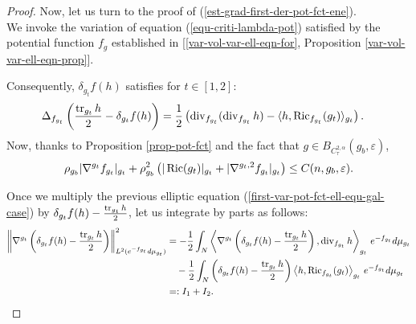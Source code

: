\documentclass[a4paper,11pt,reqno]{amsart}
\def\Ric{\mathop{\rm Ric}\nolimits}
\def\tr{\mathop{\rm tr}\nolimits}
\def\div{\mathop{\rm div}\nolimits}
\def\Ric{\mathop{\rm Ric}\nolimits}
\def\tr{\mathop{\rm tr}\nolimits}
\def\div{\mathop{\rm div}\nolimits}
\numberwithin{equation}{section}
\begin{document}
\begin{proof}
		Now, let us turn to the proof of (\ref{est-grad-first-der-pot-fct-ene}).\\
		
		We invoke the variation of equation (\ref{equ-criti-lambda-pot}) satisfied by the potential function $f_g$ established in [\eqref{var-vol-var-ell-eqn-for}, Proposition \ref{var-vol-var-ell-eqn-prop}].
		
		Consequently, $\delta_{g_t}f(h)$ satisfies for $t\in[1,2]$:
		\begin{equation}
		\begin{split}\label{first-var-pot-fct-ell-equ-gal-case}
		\Delta_{f_{g_t}}\left(\frac{\tr_{g_t}h}{2}-\delta_{g_t}f(h)\right)&=\frac{1}{2}\left(\div_{f_{g_t}}(\div_{f_{g_t}}h)-\langle h,\Ric_{f_{g_t}}(g_t)\rangle_{g_t}\right).
		\end{split}
		\end{equation}
		Now, thanks to Proposition \ref{prop-pot-fct} and the fact that $g\in B_{C^{2,\alpha}_{\tau}}(g_b,\varepsilon)$, 
		\begin{equation}
		\rho_{g_b}|\nabla^{g_t}f_{g_t}|_{g_t}+\rho^2_{g_b}\left(|\Ric(g_t)|_{g_t}+|\nabla^{g_t,2}f_{g_t}|_{g_t}\right)\leq C(n,g_b,\varepsilon).\label{est-pot-fct-ene-est}
		\end{equation}
		
		
		Once we multiply the previous elliptic equation (\ref{first-var-pot-fct-ell-equ-gal-case}) by $\delta_{g_t}f(h)-\frac{\tr_{g_t}h}{2}$, let us integrate by parts as follows:
		\begin{equation}
		\begin{split}\label{grad-first-var-pot-fct-ene-est}
		\left\|\nabla^{g_t}\left(\delta_{g_t}f(h)-\frac{\tr_{g_t}h}{2}\right)\right\|^2_{L^2(e^{-f_{g_t}}d\mu_{g_t})}&=-\frac{1}{2}\int_N\left\langle\nabla^{g_t}\left(\delta_{g_t}f(h)-\frac{\tr_{g_t}h}{2}\right),\div_{f_{g_t}} h\right\rangle_{g_t}\,e^{-f_{g_t}}d\mu_{g_t}\\
		&\quad-\frac{1}{2}\int_N\left(\delta_{g_t}f(h)-\frac{\tr_{g_t}h}{2}\right)\left\langle  h,\Ric_{f_{g_t}}(g_t)\right\rangle_{g_t}\,e^{-f_{g_t}}d\mu_{g_t}\\
		&=:I_1+I_2.
		\end{split}
		\end{equation}
		

\end{proof}
\end{document}
